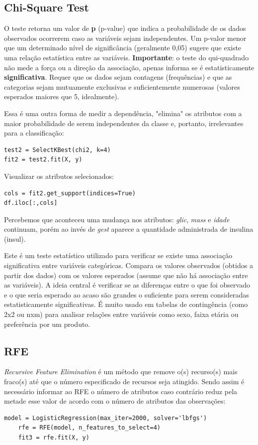 \subsection{Chi-Square Test}
O teste retorna um valor de \textbf{p} (p-value) que indica a probabilidade de os dados observados ocorrerem caso as variáveis sejam independentes. Um p-valor menor que um determinado nível de significância (geralmente 0,05) sugere que existe uma relação estatística entre as variáveis. \textbf{Importante}: o teste do qui-quadrado não mede a força ou a direção da associação, apenas informa se é estatisticamente \textbf{significativa}. Requer que os dados sejam contagens (frequências) e que as categorias sejam mutuamente exclusivas e suficientemente numerosas (valores esperados maiores que 5, idealmente).

Essa é uma outra forma de medir a dependência, "elimina" os atributos com a maior probabilidade de serem independentes da classe e, portanto, irrelevantes para a classificação:
\begin{lstlisting}[]
test2 = SelectKBest(chi2, k=4)
fit2 = test2.fit(X, y)
\end{lstlisting}

Visualizar os atributos selecionados:
\begin{lstlisting}[]
cols = fit2.get_support(indices=True)
df.iloc[:,cols]
\end{lstlisting}

Percebemos que aconteceu uma mudança nos atributos: \textit{glic}, \textit{mass} e \textit{idade} continuam, porém ao invés de \textit{gest} aparece a quantidade administrada de insulina (insul).

Este é um teste estatístico utilizado para verificar se existe uma associação significativa entre variáveis categóricas. Compara os valores observados (obtidos a partir dos dados) com os valores esperados (assume que não há associação entre as variáveis). A ideia central é verificar se as diferenças entre o que foi observado e o que seria esperado ao acaso são grandes o suficiente para serem consideradas estatisticamente significativas. É muito usado em tabelas de contingência (como 2x2 ou nxm) para analisar relações entre variáveis como sexo, faixa etária ou preferência por um produto.

\subsection{RFE}
\textit{Recursive Feature Elimination} é um método que remove o(s) recurso(s) mais fraco(s) até que o número especificado de recursos seja atingido. Sendo assim é necessário informar ao RFE o número de atributos caso contrário reduz pela metade esse valor de acordo com o número de atributos das observações:
\begin{lstlisting}[]
	model = LogisticRegression(max_iter=2000, solver='lbfgs')
	rfe = RFE(model, n_features_to_select=4)
	fit3 = rfe.fit(X, y)
\end{lstlisting}

